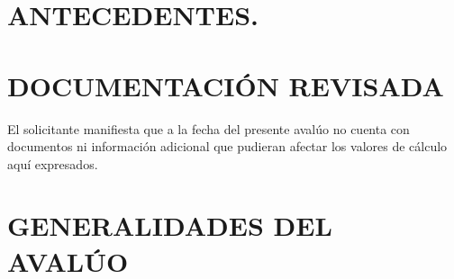 \documentclass[10pt,letter]{report}
\begin{document}
\def\sectionautorefname{Inciso}
\def\subsectionautorefname{Inciso}


\thispagestyle{plain}
%

\newpage
\setcounter{page}{1}
\thispagestyle{fancy}
\tableofcontents

\newpage



\section{ANTECEDENTES.}\label{cap:1}
\thispagestyle{fancy}

\section{DOCUMENTACIÓN REVISADA}


El solicitante  manifiesta que a la fecha del presente avalúo no cuenta con documentos ni información adicional que pudieran afectar los valores de cálculo aquí expresados.

\section{GENERALIDADES DEL AVALÚO}
\end{document}
